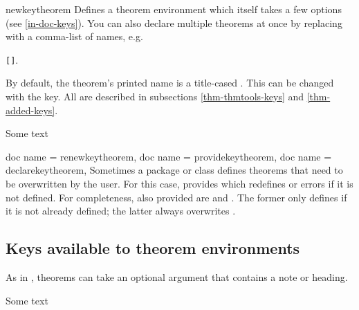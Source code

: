 \documentclass{ltxdoc}
\newcommand{\bracks}[1]{\texttt{[#1]}}
\newcommand{\ttbraces}[1]{\braces{\texttt{#1}}}
\begin{document}
\begin{docCommand}{newkeytheorem}
  {}
Defines a theorem environment  which itself takes a few options (see \autoref{in-doc-keys}).
You can also declare multiple theorems at once by replacing  with a comma-list of names, e.g.
\begin{center}
\ttbraces{theorem,lemma,proposition}\bracks{}.
\end{center}

By default, the theorem's printed name is a title-cased .
This can be changed with the  key.
All  are described in subsections \ref{thm-thmtools-keys} and \ref{thm-added-keys}.

\begin{codepreamble}
\end{codepreamble}

\begin{keythmscode}[withpreamble]
\begin{theorem}
Some text
\end{theorem}
\end{keythmscode}

\end{docCommand}

\begin{docCommands}[
  doc parameter=\marg{env name}\oarg{options}
  ]
  {
    {doc name = renewkeytheorem},
    {doc name = providekeytheorem},
    {doc name = declarekeytheorem},
  }
Sometimes a package or class defines theorems that need to be overwritten by the user. For this case,  provides  which redefines  or errors if it is not defined. For completeness, also provided are  and . The former only defines  if it is not already defined; the latter always overwrites .
\end{docCommands}

\subsection{Keys available to theorem environments} \label{in-doc-keys}

As in , theorems can take an optional argument that contains a note or heading.

\begin{keythmscode}[]
\begin{theorem}
Some text
\end{theorem}
\end{keythmscode}
\end{document}
